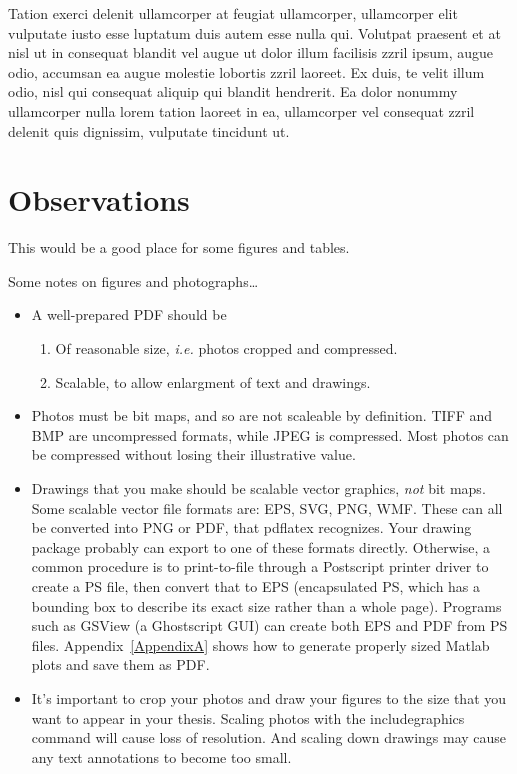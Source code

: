 \documentclass[letterpaper,12pt,titlepage,oneside,final]{book}
\begin{document}
Tation exerci delenit ullamcorper at feugiat ullamcorper, ullamcorper elit vulputate iusto esse luptatum duis autem esse nulla qui. Volutpat praesent et at nisl ut in consequat blandit vel augue ut dolor illum facilisis zzril ipsum, augue odio, accumsan ea augue molestie lobortis zzril laoreet. Ex duis, te velit illum odio, nisl qui consequat aliquip qui blandit hendrerit. Ea dolor nonummy ullamcorper nulla lorem tation laoreet in ea, ullamcorper vel consequat zzril delenit quis dignissim, vulputate tincidunt ut.

\chapter{Observations}

This would be a good place for some figures and tables.

Some notes on figures and photographs\ldots

\begin{itemize}
\item A well-prepared PDF should be 
  \begin{enumerate}
    \item Of reasonable size, {\it i.e.} photos cropped and compressed.
    \item Scalable, to allow enlargment of text and drawings. 
  \end{enumerate} 
\item Photos must be bit maps, and so are not scaleable by definition. TIFF and
BMP are uncompressed formats, while JPEG is compressed. Most photos can be
compressed without losing their illustrative value.
\item Drawings that you make should be scalable vector graphics, \emph{not} 
bit maps. Some scalable vector file formats are: EPS, SVG, PNG, WMF. These can
all be converted into PNG or PDF, that pdflatex recognizes. Your drawing 
package probably can export to one of these formats directly. Otherwise, a 
common procedure is to print-to-file through a Postscript printer driver to 
create a PS file, then convert that to EPS (encapsulated PS, which has a 
bounding box to describe its exact size rather than a whole page). 
Programs such as GSView (a Ghostscript GUI) can create both EPS and PDF from PS files.
Appendix~\ref{AppendixA} shows how to generate properly sized Matlab plots and save them as PDF.
\item It's important to crop your photos and draw your figures to the size that
you want to appear in your thesis. Scaling photos with the 
includegraphics command will cause loss of resolution. And scaling down 
drawings may cause any text annotations to become too small.
\end{itemize}
 
\end{document}
